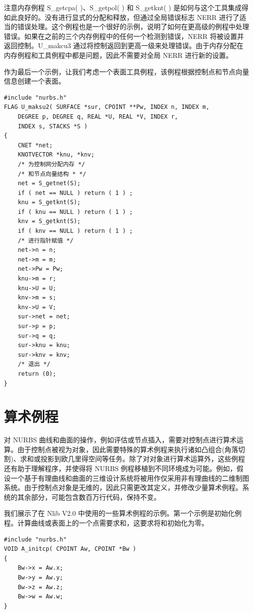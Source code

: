 \documentclass[../main.tex]{subfiles}
\begin{document}
注意内存例程 S\_getcpa(   )、S\_getpol(   ) 和 S\_getknt(   ) 是如何与这个工具集成得如此良好的。没有进行显式的分配和释放，但通过全局错误标志 NERR 进行了适当的错误处理。这个例程也是一个很好的示例，说明了如何在更高级的例程中处理错误。如果在之前的三个内存例程中的任何一个检测到错误，NERR 将被设置并返回控制。U\_makcu3 通过将控制返回到更高一级来处理错误。由于内存分配在内存例程和工具例程中都是问题，因此不需要对全局 NERR 进行新的设置。

作为最后一个示例，让我们考虑一个表面工具例程，该例程根据控制点和节点向量信息创建一个表面。

\begin{verbatim}
#include "nurbs.h"
FLAG U_maksu2( SURFACE *sur, CPOINT **Pw, INDEX n, INDEX m,
    DEGREE p, DEGREE q, REAL *U, REAL *V, INDEX r,
    INDEX s, STACKS *S )
{
    CNET *net;
    KNOTVECTOR *knu, *knv;
    /* 为控制网分配内存 */
    /* 和节点向量结构 * */
    net = S_getnet(S);
    if ( net == NULL ) return ( 1 ) ;
    knu = S_getknt(S);
    if ( knu == NULL ) return ( 1 ) ;
    knv = S_getknt(S);
    if ( knv == NULL ) return ( 1 ) ;
    /* 进行指针赋值 */
    net->n = n;
    net->m = m;
    net->Pw = Pw;
    knu->m = r;
    knu->U = U;
    knv->m = s;
    knv->U = V;
    sur->net = net;
    sur->p = p;
    sur->q = q;
    sur->knu = knu;
    sur->knv = knv;
    /* 退出 */
    return (0);
}
\end{verbatim}


\section{算术例程}

对 NURBS 曲线和曲面的操作，例如评估或节点插入，需要对控制点进行算术运算。由于控制点被视为对象，因此需要特殊的算术例程来执行诸如凸组合(角落切割)、求和或投影到欧几里得空间等任务。除了对对象进行算术运算外，这些例程还有助于理解程序，并使得将 NURBS 例程移植到不同环境成为可能。例如，假设一个基于有理曲线和曲面的三维设计系统将被用作仅采用非有理曲线的二维制图系统。由于控制点对象是无维的，因此只需更改其定义，并修改少量算术例程。系统的其余部分，可能包含数百万行代码，保持不变。

我们展示了在 Nlib V2.0 中使用的一些算术例程的示例。第一个示例是初始化例程。计算曲线或表面上的一个点需要求和，这要求将和初始化为零。

\begin{verbatim}
#include "nurbs.h"
VOID A_initcp( CPOINT Aw, CPOINT *Bw )
{
    Bw->x = Aw.x;
    Bw->y = Aw.y;
    Bw->z = Aw.z;
    Bw->w = Aw.w;
}
\end{verbatim}
\end{document}
